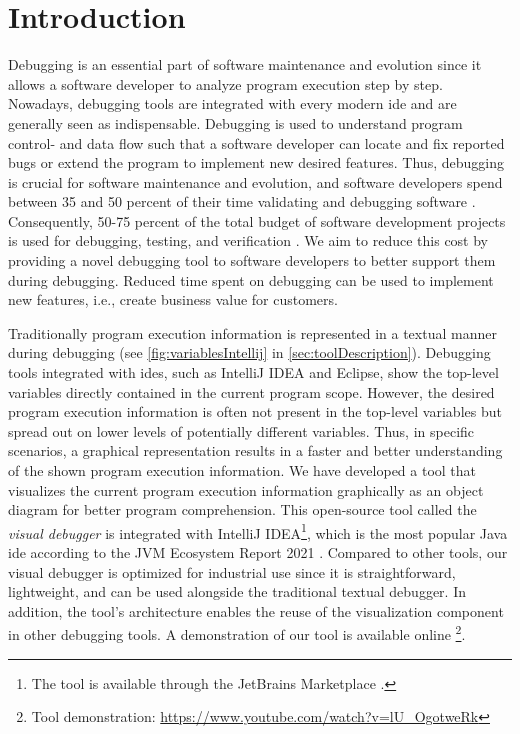 \documentclass[conference]{IEEEtran}
\newcommand{\intellij}{IntelliJ IDEA}
\begin{document}
\section{Introduction}
Debugging is an essential part of software maintenance and evolution since it allows a software developer to analyze program execution step by step.
Nowadays, debugging tools are integrated with every modern \gls*{ide} and are generally seen as indispensable.
Debugging is used to understand program control- and data flow such that a software developer can locate and fix reported bugs or extend the program to implement new desired features.
Thus, debugging is crucial for software maintenance and evolution, and software developers spend between 35 and 50 percent of their time validating and debugging software \cite{odellDebuggingMindsetUnderstanding2017}.
Consequently, 50-75 percent of the total budget of software development projects is used for debugging, testing, and verification \cite{odellDebuggingMindsetUnderstanding2017}.
We aim to reduce this cost by providing a novel debugging tool to software developers to better support them during debugging.
Reduced time spent on debugging can be used to implement new features, i.e., create business value for customers.

Traditionally program execution information is represented in a textual manner during debugging (see \cref{fig:variablesIntellij} in \cref{sec:toolDescription}).
Debugging tools integrated with \glspl*{ide}, such as \intellij{} and Eclipse, show the top-level variables directly contained in the current program scope.
However, the desired program execution information is often not present in the top-level variables but spread out on lower levels of potentially different variables.
Thus, in specific scenarios, a graphical representation results in a faster and better understanding of the shown program execution information.
We have developed a tool that visualizes the current program execution information graphically as an object diagram for better program comprehension.
This open-source tool called the \textit{visual debugger} is integrated with \intellij{}\footnote{The tool is available through the JetBrains Marketplace \cite{VisualDebuggerIntelliJ}.}, which is the most popular Java \gls*{ide} according to the JVM Ecosystem Report 2021 \cite{JVMEcosystemReport2021}.
Compared to other tools, our visual debugger is optimized for industrial use since it is straightforward, lightweight, and can be used alongside the traditional textual debugger.
In addition, the tool's architecture enables the reuse of the visualization component in other debugging tools.
A demonstration of our tool is available online \cite{ArtifactsICSME2022}\footnote{Tool demonstration: \url{https://www.youtube.com/watch?v=lU_OgotweRk}}.
\end{document}
